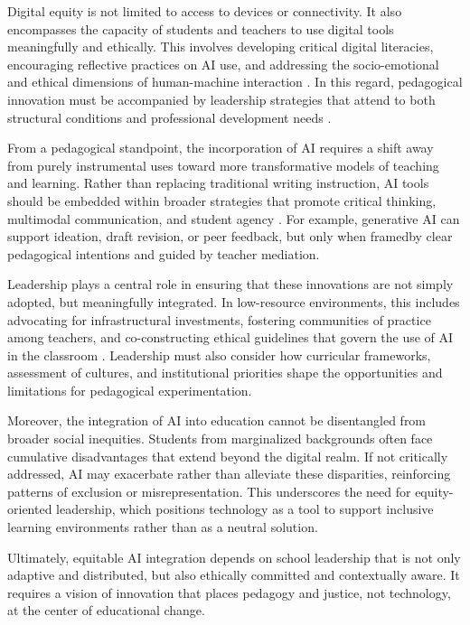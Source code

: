 \documentclass[english]{textolivre}
\begin{document}
Digital equity is not limited to access to devices or connectivity. It also encompasses the capacity of students and teachers to use digital tools meaningfully and ethically. This involves developing critical digital literacies, encouraging reflective practices on AI use, and addressing the socio-emotional and ethical dimensions of human-machine interaction \cite{knox2023repoliticising,selwyn2019should}. In this regard, pedagogical innovation must be accompanied by leadership strategies that attend to both structural conditions and professional development needs \cite{ng2023teachers}.

From a pedagogical standpoint, the incorporation of AI requires a shift away from purely instrumental uses toward more transformative models of teaching and learning. Rather than replacing traditional writing instruction, AI tools should be embedded within broader strategies that promote critical thinking, multimodal communication, and student agency \cite{rioscabrera2020innovacion}. For example, generative AI can support ideation, draft revision, or peer feedback, but only when framedby clear pedagogical intentions and guided by teacher mediation.

Leadership plays a central role in ensuring that these innovations are not simply adopted, but meaningfully integrated. In low-resource environments, this includes advocating for infrastructural investments, fostering communities of practice among teachers, and co-constructing ethical guidelines that govern the use of AI in the classroom \cite{filgueiras2024education,greco2024digital}. Leadership must also consider how curricular frameworks, assessment of cultures, and institutional priorities shape the opportunities and limitations for pedagogical experimentation.

Moreover, the integration of AI into education cannot be disentangled from broader social inequities. Students from marginalized backgrounds often face cumulative disadvantages that extend beyond the digital realm. If not critically addressed, AI may exacerbate rather than alleviate these disparities, reinforcing patterns of exclusion or misrepresentation. This underscores the need for equity-oriented leadership, which positions technology as a tool to support inclusive learning environments rather than as a neutral solution.

Ultimately, equitable AI integration depends on school leadership that is not only adaptive and distributed, but also ethically committed and contextually aware. It requires a vision of innovation that places pedagogy and justice, not technology, at the center of educational change.
\end{document}
